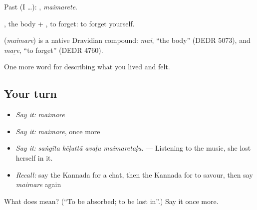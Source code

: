 Past (I …): , \emph{maimarete}.

, the body + , to forget: to forget yourself.

\begin{cousinweb}
\textbf{} (\emph{maimare}) is a native Dravidian compound: \emph{mai}, \textquotedblleft{}the body\textquotedblright{} (DEDR 5073), and \emph{maṟe}, \textquotedblleft{}to forget\textquotedblright{} (DEDR 4760).
\end{cousinweb}

\begin{grammarlens}[title={What you've built}]
One more word for describing what you lived and felt.
\end{grammarlens}

\subsection*{Your turn}
\begin{itemize}
\raggedright
  \item \emph{Say it:} \emph{maimare}
  \item \emph{Say it:} \emph{maimare}, once more
  \item \emph{Say it:} \emph{saṅgīta kēḷuttā avaḷu maimaretaḷu.} — Listening to the music, she lost herself in it.
  \item \emph{Recall:} say the Kannada for a chat, then the Kannada for to savour, then say \emph{maimare} again
\end{itemize}

\begin{tcolorbox}[breakable,colback=teal!4,colframe=teal!35!black,title={Before you move on}]
What does  mean? (\textquotedblleft{}To be absorbed; to be lost in\textquotedblright{}.) Say it once more.
\end{tcolorbox}
